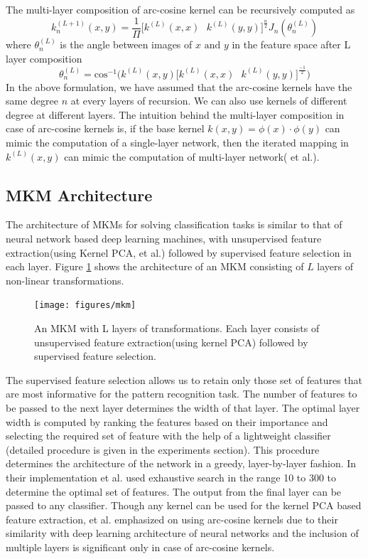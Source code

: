 The multi-layer composition of arc-cosine kernel can be recursively computed as
\[ k^{(L+1)}_n(x,y) = \frac{1}{\Pi} \Bigg[ k^{(L)}(x,x) \textrm{ } k^{(L)}(y,y)\Bigg]^{\frac{n}{2}} J_n(\theta_n^{(L)}) \]
where $\theta_n^{(L)}$ is the angle between images of $x \textrm{ and } y$ in the feature space after L layer composition
\[ \theta_n^{(L)} = \textrm{cos}^{-1}\Bigg( k^{(L)}(x,y) \Bigg[ k^{(L)}(x,x) \textrm{ } k^{(L)}(y,y)\Bigg]^{\frac{-1}{2}} \Bigg) \]
In the above formulation, we have assumed that the arc-cosine kernels have the same degree $n$ at every layers of recursion. We can also use kernels of different degree at different layers. The intuition behind the multi-layer composition in case of arc-cosine kernels is, if the base kernel $k(x,y) = \phi(x) \cdot \phi(y)$ can mimic the computation of a single-layer network, then the iterated mapping in $k^{(L)}(x,y)$ can mimic the computation of multi-layer network(\cite{saul} et al.).

\subsection{MKM Architecture}
 The architecture of MKMs for solving classification tasks  is similar to that of neural network based deep learning machines, with unsupervised feature extraction(using Kernel PCA, \cite{kpca} et al.) followed by supervised feature selection in each layer. Figure \ref{fig_mkm} shows the architecture of an MKM consisting of $L$ layers of non-linear transformations.

\begin{figure}[h]
  \centering
  \captionsetup{justification=centering,margin=0.1cm}
  \texttt{[image: figures/mkm]}
  \caption{An MKM with L layers of transformations. Each layer consists of unsupervised feature extraction(using kernel PCA) followed by supervised feature selection.}
  \label{fig_mkm}
\end{figure}

The supervised feature selection allows us to retain only those set of features that are most informative for the pattern recognition task. The number of features to be passed to the next layer determines the width of that layer. The optimal layer width is computed by ranking the features based on their importance and selecting the required set of feature with the help of a lightweight classifier (detailed procedure is given in the experiments section). This procedure determines the architecture of the network in a greedy, layer-by-layer fashion. In their implementation \cite{saul} et al. used exhaustive search in the range 10 to 300 to determine the optimal set of features. The output from the final layer can be passed to any classifier. Though any kernel can be used for the kernel PCA based feature extraction, \cite{saul} et al. emphasized on using arc-cosine kernels due to their similarity with deep learning architecture of neural networks and the inclusion of multiple layers is significant  only in case of arc-cosine kernels.

